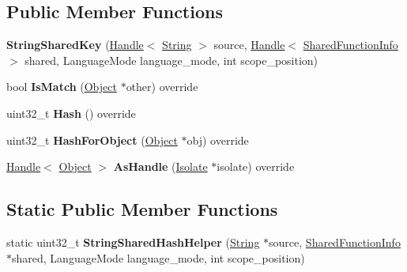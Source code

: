 \subsection*{Public Member Functions}
\begin{DoxyCompactItemize}
\item 
{\bfseries String\+Shared\+Key} (\hyperlink{classv8_1_1internal_1_1_handle}{Handle}$<$ \hyperlink{classv8_1_1internal_1_1_string}{String} $>$ source, \hyperlink{classv8_1_1internal_1_1_handle}{Handle}$<$ \hyperlink{classv8_1_1internal_1_1_shared_function_info}{Shared\+Function\+Info} $>$ shared, Language\+Mode language\+\_\+mode, int scope\+\_\+position)\hypertarget{classv8_1_1internal_1_1_string_shared_key_a36152063bdbb322f65669967813dc235}{}\label{classv8_1_1internal_1_1_string_shared_key_a36152063bdbb322f65669967813dc235}

\item 
bool {\bfseries Is\+Match} (\hyperlink{classv8_1_1internal_1_1_object}{Object} $\ast$other) override\hypertarget{classv8_1_1internal_1_1_string_shared_key_a70350a4d919d8e3cd721f43e69021ef7}{}\label{classv8_1_1internal_1_1_string_shared_key_a70350a4d919d8e3cd721f43e69021ef7}

\item 
uint32\+\_\+t {\bfseries Hash} () override\hypertarget{classv8_1_1internal_1_1_string_shared_key_a8c3a5bb8a1949fdd47693365ab05dcb2}{}\label{classv8_1_1internal_1_1_string_shared_key_a8c3a5bb8a1949fdd47693365ab05dcb2}

\item 
uint32\+\_\+t {\bfseries Hash\+For\+Object} (\hyperlink{classv8_1_1internal_1_1_object}{Object} $\ast$obj) override\hypertarget{classv8_1_1internal_1_1_string_shared_key_a84c414c8d432fb6f34bce875b6b0e9a5}{}\label{classv8_1_1internal_1_1_string_shared_key_a84c414c8d432fb6f34bce875b6b0e9a5}

\item 
\hyperlink{classv8_1_1internal_1_1_handle}{Handle}$<$ \hyperlink{classv8_1_1internal_1_1_object}{Object} $>$ {\bfseries As\+Handle} (\hyperlink{classv8_1_1internal_1_1_isolate}{Isolate} $\ast$isolate) override\hypertarget{classv8_1_1internal_1_1_string_shared_key_abea953658e4b3792e3663153a92f6aa8}{}\label{classv8_1_1internal_1_1_string_shared_key_abea953658e4b3792e3663153a92f6aa8}

\end{DoxyCompactItemize}
\subsection*{Static Public Member Functions}
\begin{DoxyCompactItemize}
\item 
static uint32\+\_\+t {\bfseries String\+Shared\+Hash\+Helper} (\hyperlink{classv8_1_1internal_1_1_string}{String} $\ast$source, \hyperlink{classv8_1_1internal_1_1_shared_function_info}{Shared\+Function\+Info} $\ast$shared, Language\+Mode language\+\_\+mode, int scope\+\_\+position)\hypertarget{classv8_1_1internal_1_1_string_shared_key_a0aefed3e23b97ae83b3d22d3706cb5b9}{}\label{classv8_1_1internal_1_1_string_shared_key_a0aefed3e23b97ae83b3d22d3706cb5b9}

\end{DoxyCompactItemize}
